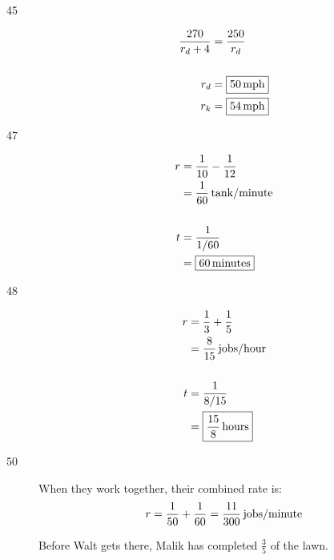 \documentclass[letterpaper, landscape]{exam}
\begin{document}
\begin{description}
      \item[45]


        \begin{align*}
          \frac{270}{r_d + 4} &= \frac{250}{r_d} \\
          \\
          r_d &= \boxed{ \unit[50]{mph} } \\
          r_k &= \boxed{ \unit[54]{mph} } \\
        \end{align*}

      \item[47]
        \begin{align*}
          r & = \frac{1}{10} - \frac{1}{12} \\
            & = \unit[\frac{1}{60}]{tank/minute} \\
          \\
          t & = \frac{1}{1/60} \\
            & = \boxed{ \unit[60]{minutes} } \\
        \end{align*}

      \item[48]
        \begin{align*}
          r & = \frac{1}{3} + \frac{1}{5} \\
          & = \unit[ \frac{8}{15} ]{jobs/hour} \\
          \\
          t & = \frac{1}{8/15} \\
            & = \boxed{ \unit[\frac{15}{8}]{hours} } \\
        \end{align*}

      \item[50]
        When they work together, their combined rate is:
        \[
          r = \frac{1}{50} + \frac{1}{60} = \unit[\frac{11}{300}]{jobs/minute}
        \]

        Before Walt gets there, Malik has completed $\frac{3}{5}$ of the lawn.


\end{description}
\end{document}
